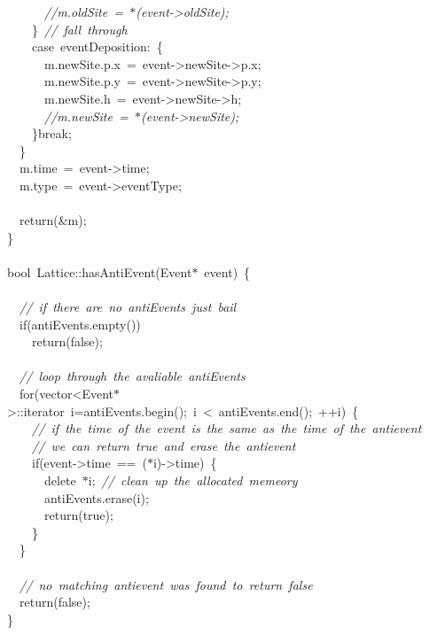 {\ \ \ \ \ \ \textsl{//m.oldSite\ =\ $\ast$(event-{}>{}oldSite);}\\
\ \ \ \ \}\ \textsl{//\ fall\ through}\\
\ \ \ \ case\ eventDeposition:\ \{\\
\ \ \ \ \ \ m.newSite.p.x\ =\ event-{}>{}newSite-{}>{}p.x;\\
\ \ \ \ \ \ m.newSite.p.y\ =\ event-{}>{}newSite-{}>{}p.y;\\
\ \ \ \ \ \ m.newSite.h\ =\ event-{}>{}newSite-{}>{}h;\\
\ \ \ \ \ \ \textsl{//m.newSite\ =\ $\ast$(event-{}>{}newSite);}\\
\ \ \ \ \}break;\\
\ \ \}\\
\ \ m.time\ =\ event-{}>{}time;\\
\ \ m.type\ =\ event-{}>{}eventType;\\
\ \\
\ \ return(\&m);\\
\}\\
\ \\
bool\ Lattice::hasAntiEvent(Event$\ast$\ event)\ \{\\
\ \\
\ \ \textsl{//\ if\ there\ are\ no\ antiEvents\ just\ bail}\\
\ \ if(antiEvents.empty())\\
\ \ \ \ return(false);\\
\ \\
\ \ \textsl{//\ loop\ through\ the\ avaliable\ antiEvents}\\
\ \ for(vector<{}Event$\ast$>{}::iterator\ i=antiEvents.begin();\ i\ <{}\ antiEvents.end();\ ++i)\ \{\\
\ \ \ \ \textsl{//\ if\ the\ time\ of\ the\ event\ is\ the\ same\ as\ the\ time\ of\ the\ antievent}\\
\ \ \ \ \textsl{//\ we\ can\ return\ true\ and\ erase\ the\ antievent}\\
\ \ \ \ if(event-{}>{}time\ ==\ ($\ast$i)-{}>{}time)\ \{\\
\ \ \ \ \ \ delete\ $\ast$i;\ \textsl{//\ clean\ up\ the\ allocated\ memeory}\\
\ \ \ \ \ \ antiEvents.erase(i);\\
\ \ \ \ \ \ return(true);\\
\ \ \ \ \}\\
\ \ \}\\
\ \\
\ \ \textsl{//\ no\ matching\ antievent\ was\ found\ to\ return\ false}\\
\ \ return(false);\\
\}\\
\ \\
 }
\normalfont\normalsize

